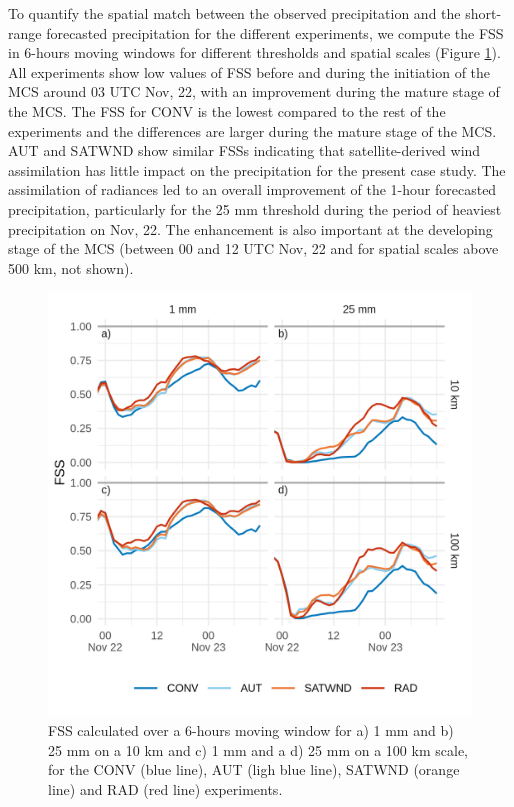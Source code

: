\documentclass[final,5p,times,twocolumn,authoryear]{elsarticle} %
\begin{document}
To quantify the spatial match between the observed precipitation and the short-range forecasted precipitation for the different experiments, we compute the FSS in 6-hours moving windows for different thresholds and spatial scales (Figure \ref{fig:fss}). All experiments show low values of FSS before and during the initiation of the MCS around 03 UTC Nov, 22, with an improvement during the mature stage of the MCS. The FSS for CONV is the lowest compared to the rest of the experiments and the differences are larger during the mature stage of the MCS. AUT and SATWND show similar FSSs indicating that satellite-derived wind assimilation has little impact on the precipitation for the present case study. The assimilation of radiances led to an overall improvement of the 1-hour forecasted precipitation, particularly for the 25 mm threshold during the period of heaviest precipitation on Nov, 22. The enhancement is also important at the developing stage of the MCS (between 00 and 12 UTC Nov, 22 and for spatial scales above 500 km, not shown).



\begin{figure}
\centering
\includegraphics{../figures/fss-1.png}
\caption{\label{fig:fss}FSS calculated over a 6-hours moving window for a) 1 mm and b) 25 mm on a 10 km and c) 1 mm and a d) 25 mm on a 100 km scale, for the CONV (blue line), AUT (ligh blue line), SATWND (orange line) and RAD (red line) experiments.}
\end{figure}
\end{document}
